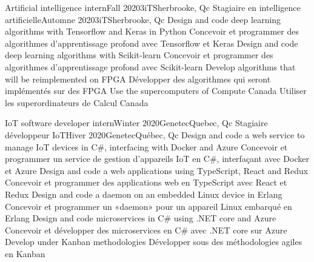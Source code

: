     \resumeSubheadingEnFr
        {Artificial intelligence intern}{Fall 2020}{3iT}{Sherbrooke, Qc}
        {Stagiaire en intelligence artificielle}{Automne 2020}{3iT}{Sherbrooke, Qc}
            \resumeItemListStart
                \resumeItemEnFr
                    {Design and code deep learning algorithms with Tensorflow and Keras in Python}
                    {Concevoir et programmer des algorithmes d’apprentissage profond avec Tensorflow et Keras}
                \resumeItemEnFr
                    {Design and code deep learning algorithms with Scikit-learn}
                    {Concevoir et programmer des algorithmes d'apprentissage profond avec Scikit-learn}
                \resumeItemEnFr
                    {Develop algorithms that will be reimplemented on FPGA}
                    {Développer des algorithmes qui seront implémentés sur des FPGA}
                \resumeItemEnFr
                    {Use the supercomputers of Compute Canada}
                    {Utiliser les superordinateurs de Calcul Canada}
            \resumeItemListEnd
        
    \resumeSubheadingEnFr
        {IoT software developer intern}{Winter 2020}{Genetec}{Quebec, Qc}
        {Stagiaire développeur IoT}{Hiver 2020}{Genetec}{Québec, Qc}
            \resumeItemListStart
                \resumeItemEnFr
                    {Design and code a web service to manage IoT devices in C\#, interfacing with Docker and Azure}
                    {Concevoir et programmer un service de gestion d’appareils IoT en C\#, interfaçant avec Docker et Azure}
                \resumeItemEnFr
                    {Design and code a web applications using TypeScript, React and Redux}
                    {Concevoir et programmer des applications web en TypeScript avec React et Redux}
                \resumeItemEnFr
                    {Design and code a daemon on an embedded Linux device in Erlang}
                    {Concevoir et programmer un «daemon» pour un appareil Linux embarqué en Erlang}
                \resumeItemEnFr
                    {Design and code microservices in C\# using .NET core and Azure}
                    {Concevoir et développer des microservices en C\# avec .NET core sur Azure}
                \resumeItemEnFr
                    {Develop under Kanban methodologies}
                    {Développer sous des méthodologies agiles en Kanban}
            \resumeItemListEnd

